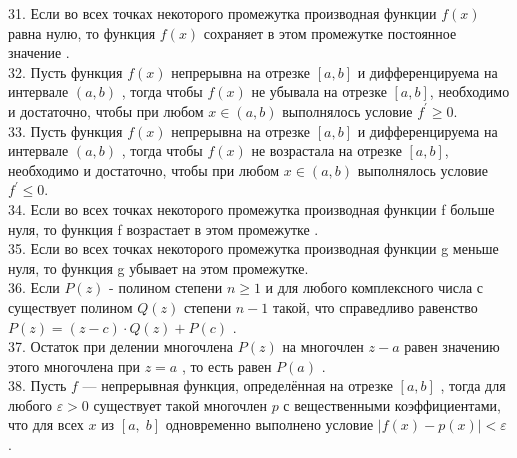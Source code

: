 \documentclass[12pt]{article}
\begin{document}
31. Если во всех точках некоторого промежутка производная функции ${\displaystyle f(x)}$ равна нулю, то функция ${\displaystyle f(x)}$ сохраняет в этом промежутке постоянное значение .\\

32. Пусть функция ${\displaystyle f(x)}$ непрерывна на отрезке  ${\displaystyle [a,b]}$ и дифференцируема на интервале ${\displaystyle (a,b)}$ ,  тогда чтобы ${\displaystyle f(x)}$ не убывала на отрезке ${\displaystyle [a,b]}$, необходимо и достаточно, чтобы при любом ${\displaystyle x \in (a,b)}$ выполнялось условие ${\displaystyle f^{\prime} \geq 0}$.\\

33. Пусть функция ${\displaystyle f(x)}$ непрерывна на отрезке  ${\displaystyle [a,b]}$ и дифференцируема на интервале ${\displaystyle (a,b)}$ ,  тогда чтобы ${\displaystyle f(x)}$ не возрастала на отрезке ${\displaystyle [a,b]}$, необходимо и достаточно, чтобы при любом ${\displaystyle x \in (a,b)}$ выполнялось условие ${\displaystyle f^{\prime} \leq 0}$.\\

34. Если во всех точках некоторого промежутка производная функции f больше нуля, то функция f возрастает в этом промежутке .\\

35. Если во всех точках некоторого промежутка производная функции g меньше нуля, то функция g убывает на этом промежутке.\\

36. Если ${\displaystyle P(z)}$ - полином степени ${\displaystyle n \geq 1}$ и для любого комплексного числа ${\displaystyle с}$ существует полином ${\displaystyle Q(z)}$ степени ${\displaystyle n-1}$ такой, что справедливо равенство ${\displaystyle P(z)=(z-c)\cdot Q(z)+P(c)}$ .\\

37. Остаток при делении многочлена ${\displaystyle P(z)}$ на многочлен ${\displaystyle z-a}$ равен значению этого многочлена при ${\displaystyle z=a}$ , то есть равен ${\displaystyle P(a)}$ .\\

38. Пусть ${\displaystyle f}$ — непрерывная функция, определённая на отрезке ${\displaystyle [a,b]}$ , тогда для любого ${\displaystyle \varepsilon >0}$ существует такой многочлен ${\displaystyle p}$  с вещественными коэффициентами, что для всех ${\displaystyle x}$  из ${\displaystyle [a,\;b]}$ одновременно выполнено условие ${\displaystyle |f(x)-p(x)|<\varepsilon }$ .\\
\end{document}
